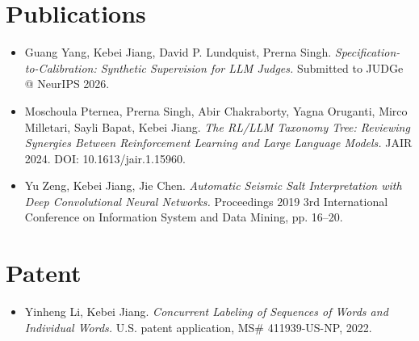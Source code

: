 \documentclass[10pt,letterpaper]{article}
\begin{document}
\section*{Publications}
\begin{itemize}
\item Guang Yang, Kebei Jiang, David P. Lundquist, Prerna Singh. \textit{Specification-to-Calibration: Synthetic Supervision for LLM Judges.} Submitted to JUDGe @ NeurIPS 2026.
\item Moschoula Pternea, Prerna Singh, Abir Chakraborty, Yagna Oruganti, Mirco Milletari, Sayli Bapat, Kebei Jiang. \textit{The RL/LLM Taxonomy Tree: Reviewing Synergies Between Reinforcement Learning and Large Language Models.} JAIR 2024. DOI: 10.1613/jair.1.15960.
\item Yu Zeng, Kebei Jiang, Jie Chen. \textit{Automatic Seismic Salt Interpretation with Deep Convolutional Neural Networks.} Proceedings 2019 3rd International Conference on Information System and Data Mining, pp. 16--20.
\end{itemize}

\section{Patent}
\begin{itemize}
\item Yinheng Li, Kebei Jiang. \textit{Concurrent Labeling of Sequences of Words and Individual Words.} U.S. patent application, MS\# 411939-US-NP, 2022.
\end{itemize}
\end{document}
